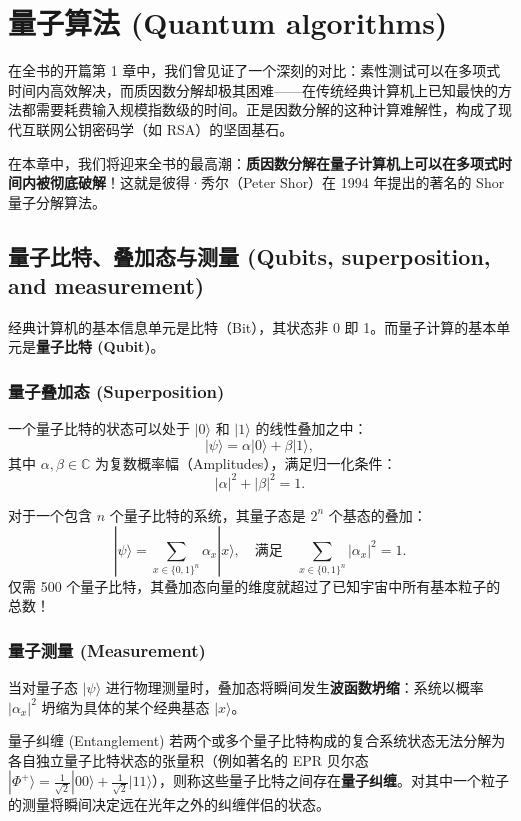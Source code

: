 \chapter{量子算法 (Quantum algorithms)}

在全书的开篇第 1 章中，我们曾见证了一个深刻的对比：素性测试可以在多项式时间内高效解决，而质因数分解却极其困难——在传统经典计算机上已知最快的方法都需要耗费输入规模指数级的时间。正是因数分解的这种计算难解性，构成了现代互联网公钥密码学（如 RSA）的坚固基石。

在本章中，我们将迎来全书的最高潮：\textbf{质因数分解在量子计算机上可以在多项式时间内被彻底破解}！这就是彼得·秀尔（Peter Shor）在 1994 年提出的著名的 Shor 量子分解算法。

\section{量子比特、叠加态与测量 (Qubits, superposition, and measurement)}

经典计算机的基本信息单元是比特（Bit），其状态非 0 即 1。而量子计算的基本单元是\textbf{量子比特 (Qubit)}。

\subsection*{量子叠加态 (Superposition)}
一个量子比特的状态可以处于 $|0\rangle$ 和 $|1\rangle$ 的线性叠加之中：
\[
|\psi\rangle = \alpha |0\rangle + \beta |1\rangle,
\]
其中 $\alpha, \beta \in \mathbb{C}$ 为复数概率幅（Amplitudes），满足归一化条件：
\[
|\alpha|^2 + |\beta|^2 = 1.
\]

对于一个包含 $n$ 个量子比特的系统，其量子态是 $2^n$ 个基态的叠加：
\[
|\psi\rangle = \sum_{x \in \{0, 1\}^n} \alpha_x |x\rangle, \quad \text{满足} \quad \sum_{x \in \{0, 1\}^n} |\alpha_x|^2 = 1.
\]
仅需 500 个量子比特，其叠加态向量的维度就超过了已知宇宙中所有基本粒子的总数！

\subsection*{量子测量 (Measurement)}
当对量子态 $|\psi\rangle$ 进行物理测量时，叠加态将瞬间发生\textbf{波函数坍缩}：系统以概率 $|\alpha_x|^2$ 坍缩为具体的某个经典基态 $|x\rangle$。

\begin{sidebarbox}{量子纠缠 (Entanglement)}
若两个或多个量子比特构成的复合系统状态无法分解为各自独立量子比特状态的张量积（例如著名的 EPR 贝尔态 $|\Phi^+\rangle = \frac{1}{\sqrt{2}}|00\rangle + \frac{1}{\sqrt{2}}|11\rangle$），则称这些量子比特之间存在\textbf{量子纠缠}。对其中一个粒子的测量将瞬间决定远在光年之外的纠缠伴侣的状态。
\end{sidebarbox}

